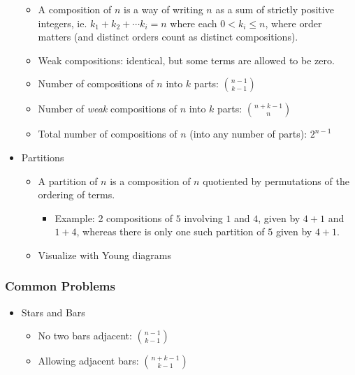 \begin{itemize}
  \begin{itemize}
  \tightlist
  \item
    A composition of \(n\) is a way of writing \(n\) as a sum of
    strictly positive integers, ie. \(k_1 + k_2 + \cdots k_i = n\) where
    each \(0 < k_i \leq n\), where order matters (and distinct orders
    count as distinct compositions).
  \item
    Weak compositions: identical, but some terms are allowed to be zero.
  \item
    Number of compositions of \(n\) into \(k\) parts:
    \(n-1 \choose k - 1\)
  \item
    Number of \emph{weak} compositions of \(n\) into \(k\) parts:
    \(n+k-1 \choose n\)
  \item
    Total number of compositions of \(n\) (into any number of parts):
    \(2^{n-1}\)
  \end{itemize}
\item
  Partitions

  \begin{itemize}
  \tightlist
  \item
    A partition of \(n\) is a composition of \(n\) quotiented by
    permutations of the ordering of terms.

    \begin{itemize}
    \tightlist
    \item
      Example: 2 compositions of \(5\) involving \(1\) and \(4\), given
      by \(4+1\) and \(1+4\), whereas there is only one such partition
      of \(5\) given by \(4+1\).
    \end{itemize}
  \item
    Visualize with Young diagrams
  \end{itemize}
\end{itemize}

\hypertarget{common-problems-1}{%
\subsubsection{Common Problems}\label{common-problems-1}}

\begin{itemize}
\tightlist
\item
  Stars and Bars

  \begin{itemize}
  \tightlist
  \item
    No two bars adjacent: \(n-1\choose k-1\)
  \item
    Allowing adjacent bars: \(n+k-1 \choose k-1\)
  \end{itemize}
\end{itemize}

